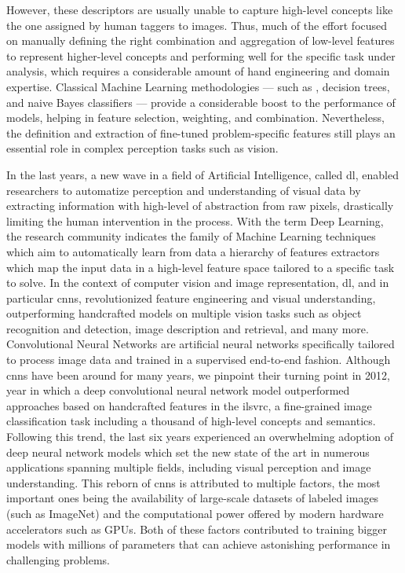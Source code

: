 However, these descriptors are usually unable to capture high-level concepts like the one assigned by human taggers to images.
Thus, much of the effort focused on manually defining the right combination and aggregation of low-level features to represent higher-level concepts and performing well for the specific task under analysis, which requires a considerable amount of hand engineering and domain expertise.
Classical Machine Learning methodologies --- such as , decision trees, and naive Bayes classifiers --- provide a considerable boost to the performance of models, helping in feature selection, weighting, and combination.
Nevertheless, the definition and extraction of fine-tuned problem-specific features still plays an essential role in complex perception tasks such as vision.

In the last years, a new wave in a field of Artificial Intelligence, called \gls{dl}, enabled researchers to automatize perception and understanding of visual data by extracting information with high-level of abstraction from raw pixels, drastically limiting the human intervention in the process.
With the term Deep Learning, the research community indicates the family of Machine Learning techniques which aim to automatically learn from data a hierarchy of features extractors which map the input data in a high-level feature space tailored to a specific task to solve.
In the context of computer vision and image representation, \acrlong{dl}, and in particular \glspl{cnn}, revolutionized feature engineering and visual understanding, outperforming handcrafted models on multiple vision tasks such as object recognition and detection, image description and retrieval,  and many more.
Convolutional Neural Networks are artificial neural networks specifically tailored to process image data and trained in a supervised end-to-end fashion.
Although \glspl{cnn} have been around for many years, we pinpoint their turning point in 2012, year in which a deep convolutional neural network model outperformed approaches based on handcrafted features in the \acrlong{ilsvrc}, a fine-grained image classification task including a thousand of high-level concepts and semantics.
Following this trend, the last six years experienced an overwhelming adoption of deep neural network models which set the new state of the art in numerous applications spanning multiple fields, including visual perception and image understanding.
This reborn of \glspl{cnn} is attributed to multiple factors, the most important ones being the availability of large-scale datasets of labeled images (such as ImageNet) and the computational power offered by modern hardware accelerators such as GPUs.
Both of these factors contributed to training bigger models with millions of parameters that can achieve astonishing performance in challenging problems.

